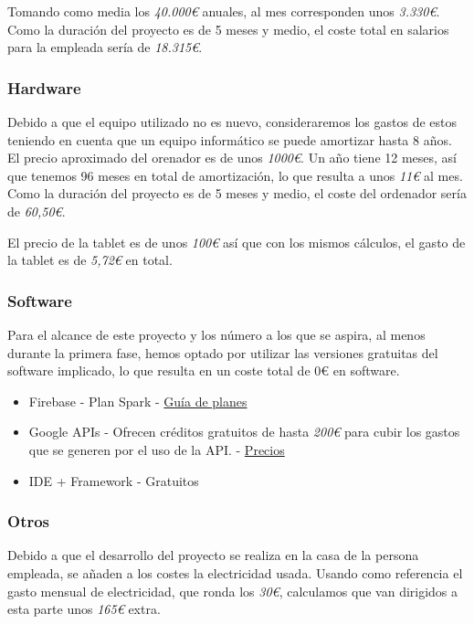 \documentclass[a4paper, 12pt]{article}
\begin{document}
Tomando como media los \textit{40.000€ } anuales, al mes corresponden unos \textit{3.330€}. Como la duración del proyecto es de 5 meses y medio, el coste total en salarios para la empleada sería de \textit{18.315€}.

\subsubsection{Hardware}

Debido a que el equipo utilizado no es nuevo, consideraremos los gastos de estos teniendo en cuenta que un equipo informático se puede amortizar hasta 8 años. El precio aproximado del orenador es de unos \textit{1000€}.
Un año tiene 12 meses, así que tenemos 96 meses en total de amortización, lo que resulta a unos \textit{11€} al mes. Como la duración del proyecto es de 5 meses y medio, el coste del ordenador sería de \textit{60,50€}.

El precio de la tablet es de unos \textit{100€} así que con los mismos cálculos, el gasto de la tablet es de \textit{5,72€} en total.

\subsubsection{Software}

Para el alcance de este proyecto y los número a los que se aspira, al menos durante la primera fase, hemos optado por utilizar las versiones gratuitas del software implicado, lo que resulta en un coste total de 0€ en software.
\begin{itemize}
	\item Firebase - Plan Spark - \href{https://firebase.google.com/pricing?hl=es-419}{Guía de planes}
	\item Google APIs - Ofrecen créditos gratuitos de hasta \textit{200€} para cubir los gastos que se generen por el uso de la API. - \href{https://mapsplatform.google.com/intl/es/pricing/}{Precios}
	\item IDE + Framework - Gratuitos
\end{itemize}


\subsubsection{Otros}

Debido a que el desarrollo del proyecto se realiza en la casa de la persona empleada, se añaden a los costes la electricidad usada. Usando como referencia el gasto mensual de electricidad, que ronda los \textit{30€}, calculamos que van dirigidos a esta parte unos \textit{165€} extra.
\end{document}
